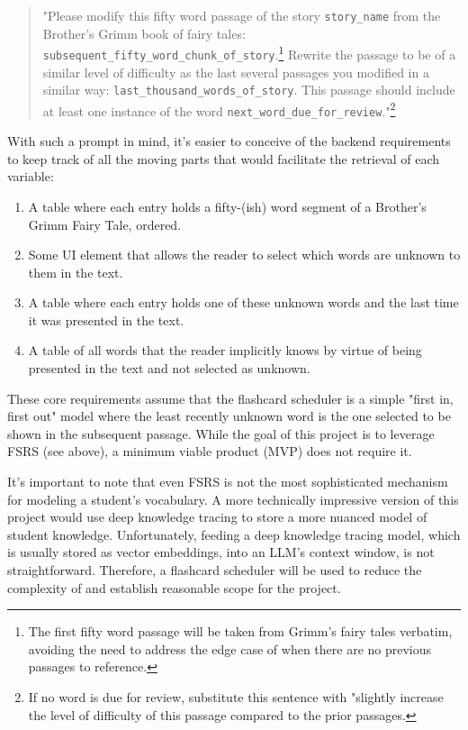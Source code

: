 \documentclass[
	letterpaper, %
]{jdf}
\newcommand{\storyname}{\texttt{story\_name}}
\newcommand{\nextfifty}{\texttt{subsequent\_fifty\_word\_chunk\_of\_story}}
\newcommand{\previousthousand}{\texttt{last\_thousand\_words\_of\_story}}
\newcommand{\nextword}{\texttt{next\_word\_due\_for\_review}}
\begin{document}
\begin{adjustwidth}{0.5in}{0.5in}
\begin{quote}
"Please modify this fifty word passage of the story \storyname{} from the Brother's Grimm book of fairy tales: \nextfifty{}.\footnote{The first fifty word passage will be taken from Grimm's fairy tales verbatim, avoiding the need to address the edge case of when there are no previous passages to reference.} Rewrite the passage to be of a similar level of difficulty as the last several passages you modified in a similar way: \previousthousand{}. This passage should include at least one instance of the word \nextword{}."\footnote{If no word is due for review, substitute this sentence with "slightly increase the level of difficulty of this passage compared to the prior passages.}
\end{quote}
\end{adjustwidth}

With such a prompt in mind, it's easier to conceive of the backend requirements to keep track of all the moving parts that would facilitate the retrieval of each variable:

\begin{enumerate}
    \item A table where each entry holds a fifty-(ish) word segment of a Brother's Grimm Fairy Tale, ordered.
    \item Some UI element that allows the reader to select which words are unknown to them in the text.
    \item A table where each entry holds one of these unknown words and the last time it was presented in the text.
    \item A table of all words that the reader implicitly knows by virtue of being presented in the text and not selected as unknown.
\end{enumerate}

These core requirements assume that the flashcard scheduler is a simple "first in, first out" model where the least recently unknown word is the one selected to be shown in the subsequent passage. While the goal of this project is to leverage FSRS (see above), a minimum viable product (MVP) does not require it.

It's important to note that even FSRS is not the most sophisticated mechanism for modeling a student's vocabulary. A more technically impressive version of this project would use deep knowledge tracing \cite{deep_knowledge_tracing} to store a more nuanced model of student knowledge. Unfortunately, feeding a deep knowledge tracing model, which is usually stored as vector embeddings, into an LLM's context window, is not straightforward. Therefore, a flashcard scheduler will be used to reduce the complexity of and establish reasonable scope for the project.
\end{document}
